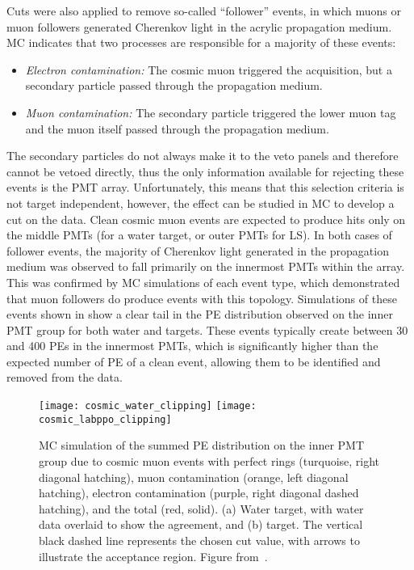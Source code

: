 Cuts were also applied to remove so-called ``follower'' events, in which muons or muon followers generated Cherenkov light in the acrylic propagation medium.
MC indicates that two processes are responsible for a majority of these events: 
\begin{itemize}
\item \emph{Electron contamination:} The cosmic muon triggered the acquisition, but a secondary particle passed through the propagation medium.
\item \emph{Muon contamination:} The secondary particle triggered the lower muon tag and the muon itself passed through the propagation medium.  
\end{itemize}
The secondary particles do not always make it to the veto panels and therefore cannot be vetoed directly, thus the only information available for rejecting these events is the PMT array.  
Unfortunately, this means that this selection criteria is not target independent, however, the effect can be studied in MC to develop a cut on the data.
Clean cosmic muon events are expected to produce hits only on the middle PMTs (for a water target, or outer PMTs for LS).
In both cases of follower events, the majority of Cherenkov light generated in the propagation medium was observed to fall primarily on the innermost PMTs within the array.  
This was confirmed by MC simulations of each event type, which demonstrated that muon followers do produce events with this topology.   
Simulations of these events shown in  show a clear tail in the PE distribution observed on the inner PMT group for both water and {\labppo} targets.
These events typically create between 30 and 400 PEs in the innermost PMTs, which is significantly higher than the expected number of PE of a clean event, allowing them to be identified and removed from the data.

\begin{figure}
\centering
\texttt{[image: cosmic\_water\_clipping]}
\texttt{[image: cosmic\_labppo\_clipping]}
\caption{MC simulation of the summed PE distribution on the inner PMT group due to cosmic muon events with perfect rings (turquoise, right diagonal hatching), muon contamination (orange, left diagonal hatching), electron contamination (purple, right diagonal dashed hatching), and the total (red, solid).  (a) Water target, with water data overlaid to show the agreement, and (b) {\labppo} target.  The vertical black dashed line represents the chosen cut value, with arrows to illustrate the acceptance region. Figure from~\cite{chess_nim}.}
\label{f:clipMC}
\end{figure}

